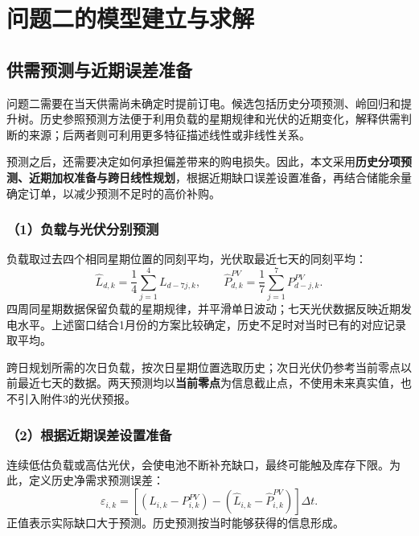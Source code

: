 \section{问题二的模型建立与求解}
\subsection{供需预测与近期误差准备}
问题二需要在当天供需尚未确定时提前订电。候选包括历史分项预测、岭回归\cite{hoerl}和提升树\cite{friedman}。历史参照预测方法\cite{hyndman}便于利用负载的星期规律和光伏的近期变化，解释供需判断的来源；后两者则可利用更多特征描述线性或非线性关系。

预测之后，还需要决定如何承担偏差带来的购电损失。因此，本文采用\textbf{历史分项预测、近期加权准备与跨日线性规划}，根据近期缺口误差设置准备，再结合储能余量确定订单，以减少预测不足时的高价补购。

\subsubsection*{（1）负载与光伏分别预测}
负载取过去四个相同星期位置的同刻平均，光伏取最近七天的同刻平均：
\begin{equation}
\widehat L_{d,k}=\frac14\sum_{j=1}^{4}L_{d-7j,k},\qquad
\widehat P^{PV}_{d,k}=\frac17\sum_{j=1}^{7}P^{PV}_{d-j,k}.
\label{eq:q2_forecast}
\end{equation}
四周同星期数据保留负载的星期规律，并平滑单日波动；七天光伏数据反映近期发电水平。上述窗口结合1月份的方案比较确定，历史不足时对当时已有的对应记录取平均。

跨日规划所需的次日负载，按次日星期位置选取历史；次日光伏仍参考当前零点以前最近七天的数据。两天预测均以\textbf{当前零点}为信息截止点，不使用未来真实值，也不引入附件3的光伏预报。

\subsubsection*{（2）根据近期误差设置准备}
连续低估负载或高估光伏，会使电池不断补充缺口，最终可能触及库存下限。为此，定义历史净需求预测误差：
\begin{equation}
\varepsilon_{i,k}=\left[(L_{i,k}-P^{PV}_{i,k})-(\widehat L_{i,k}-\widehat P^{PV}_{i,k})\right]\Delta t.
\label{eq:q2_error}
\end{equation}
正值表示实际缺口大于预测。历史预测按当时能够获得的信息形成。

